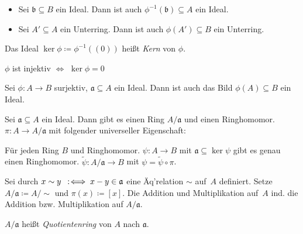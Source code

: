 \documentclass{cheat-sheet}
\newcommand{\aaa}{\mathfrak{a}}
\newcommand{\bbb}{\mathfrak{b}}
\begin{document}

\begin{prop}
  \begin{itemize}
    \item Sei $\bbb \subseteq B$ ein Ideal.
    Dann ist auch $\phi^{-1}(\bbb) \subseteq A$ ein Ideal.
    \item Sei $A' \subseteq A$ ein Unterring.
    Dann ist auch $\phi(A') \subseteq B$ ein Unterring.
  \end{itemize}
\end{prop}

\begin{defn}
  Das Ideal $\ker \phi \coloneqq \phi^{-1}((0))$ heißt \emph{Kern} von $\phi$.
\end{defn}

\begin{bem}
  $\phi$ ist injektiv $\iff$ $\ker \phi = 0$
\end{bem}

\begin{prop}
  Sei $\phi : A \to B$ surjektiv, $\aaa \subseteq A$ ein Ideal.
  Dann ist auch das Bild $\phi(A) \subseteq B$ ein Ideal.
\end{prop}


\begin{prop}
  Sei $\aaa \subseteq A$ ein Ideal.
  Dann gibt es einen Ring $A/\aaa$ und einen Ringhomomor. $\pi : A \to A/\aaa$ mit folgender universeller Eigenschaft:

  \hfill\begin{minipage}{0.95 \linewidth}
    Für jeden Ring $B$ und Ringhomomor. $\psi : A \to B$ mit $\aaa \subseteq \ker \psi$ gibt es genau einen Ringhomomor. $\widetilde{\psi} : A/\aaa \to B$ mit $\psi = \widetilde{\psi} \circ \pi$.
  \end{minipage}
\end{prop}

\begin{konstr}
  Sei durch $x \sim y \coloniff x - y \in \aaa$ eine Äq'relation $\sim$ auf~$A$ definiert.
  Setze $A/\aaa \coloneqq A/{\sim}$ und $\pi(x) \coloneqq [x]$.
  Die Addition und Multiplikation auf~$A$ ind. die Addition bzw. Multiplikation auf $A/\aaa$.
\end{konstr}

\begin{defn}
  $A/\aaa$ heißt \emph{Quotientenring} von $A$ nach $\aaa$.
\end{defn}
\end{document}
